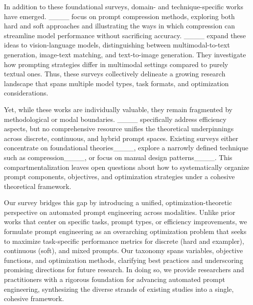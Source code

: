 In addition to these foundational surveys, domain- and technique-specific works have emerged. 
____ focus on prompt compression methods, exploring both hard and soft approaches and illustrating the ways in which compression can streamline model performance without sacrificing accuracy. 
____ expand these ideas to vision-language models, distinguishing between multimodal-to-text generation, image-text matching, and text-to-image generation. 
They investigate how prompting strategies differ in multimodal settings compared to purely textual ones. 
Thus, these surveys collectively delineate a growing research landscape that spans multiple model types, task formats, and optimization considerations.

Yet, while these works are individually valuable, they remain fragmented by methodological or modal boundaries. 
____ specifically address efficiency aspects, but no comprehensive resource unifies the theoretical underpinnings across discrete, continuous, and hybrid prompt spaces. 
Existing surveys either concentrate on foundational theories____, explore a narrowly defined technique such as compression____, or focus on manual design patterns____.
This compartmentalization leaves open questions about how to systematically organize prompt components, objectives, and optimization strategies under a cohesive theoretical framework.

Our survey bridges this gap by introducing a unified, optimization-theoretic perspective on automated prompt engineering across modalities. 
Unlike prior works that center on specific tasks, prompt types, or efficiency improvements, we formulate prompt engineering as an overarching optimization problem that seeks to maximize task-specific performance metrics for discrete (hard and exampler), continuous (soft), and mixed prompts. 
Our taxonomy spans variables, objective functions, and optimization methods, clarifying best practices and underscoring promising directions for future research. 
In doing so, we provide researchers and practitioners with a rigorous foundation for advancing automated prompt engineering, synthesizing the diverse strands of existing studies into a single, cohesive framework.